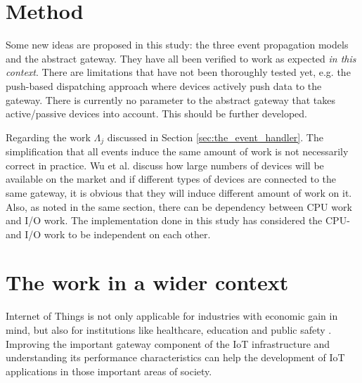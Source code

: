 \section{Method}
\label{sec:discussion-method}

Some new ideas are proposed in this study: the three event propagation models
and the abstract gateway. They have all been verified to work as expected
\textit{in this context}. There are limitations that have not been thoroughly
tested yet, e.g. the push-based dispatching approach where devices actively
push data to the gateway. There is currently no parameter to the abstract
gateway that takes active/passive devices into account. This should be further
developed.

Regarding the work $\Lambda_j$ discussed in Section
\ref{sec:the_event_handler}. The simplification that all events induce the same
amount of work is not necessarily correct in practice. Wu et al.
\cite{wu2011m2m} discuss how large numbers of devices will be available on the
market and if different types of devices are connected to the same gateway, it
is obvious that they will induce different amount of work on it. Also, as noted
in the same section, there can be dependency between CPU work and I/O work. The
implementation done in this study has considered the CPU- and I/O work to be
independent on each other.

\section{The work in a wider context}
\label{sec:work-wider-context}

Internet of Things is not only applicable for industries with economic gain in
mind, but also for institutions like healthcare, education and public safety
\cite{gubbi2013internet}. Improving the important gateway component of the IoT
infrastructure and understanding its performance characteristics can help the
development of IoT applications in those important areas of society.
